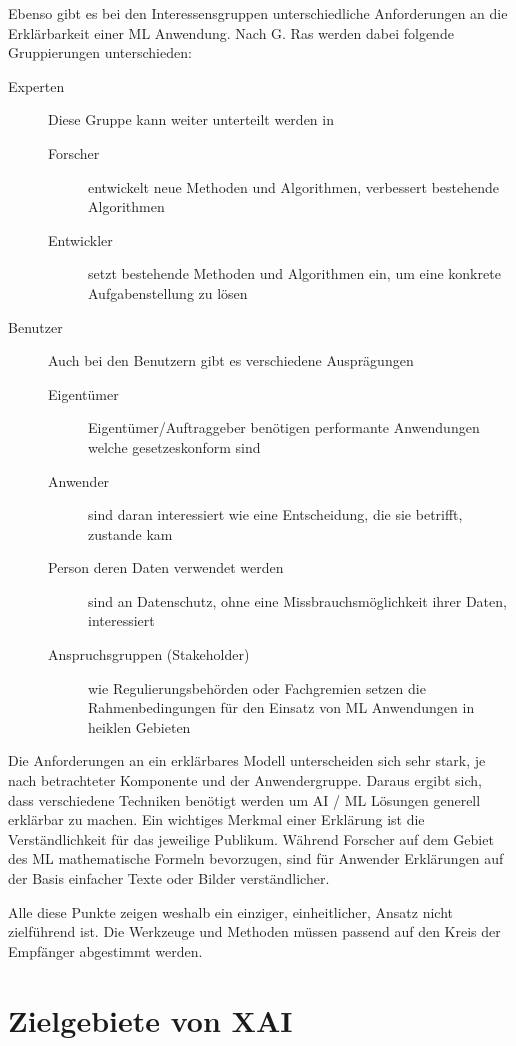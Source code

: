 \documentclass[
  12pt, %
  a4paper, %
  oneside, %
  openany, 
  numbers=noenddot, %
  BCOR=5mm, %
  parskip=half*, %
  thesis, %
]{bfhbook}
\begin{document}
Ebenso gibt es bei den Interessensgruppen unterschiedliche Anforderungen an die Erklärbarkeit einer ML Anwendung. Nach G. Ras \parencite{Ras2018} werden dabei folgende Gruppierungen unterschieden:
\begin{description}
  \item[Experten]
  Diese Gruppe kann weiter unterteilt werden in
  	\begin{description}
  		\item[Forscher] entwickelt neue Methoden und Algorithmen, verbessert bestehende Algorithmen
  		\item[Entwickler] setzt bestehende Methoden und Algorithmen ein, um eine konkrete Aufgabenstellung zu lösen
	\end{description}
  \item[Benutzer]
  Auch bei den Benutzern gibt es verschiedene Ausprägungen
  	\begin{description}
  		\item[Eigentümer] Eigentümer/Auftraggeber benötigen performante Anwendungen welche gesetzeskonform sind
  		\item[Anwender] sind daran interessiert wie eine Entscheidung, die sie betrifft, zustande kam
  		\item[Person deren Daten verwendet werden] sind an Datenschutz, ohne eine Missbrauchsmöglichkeit ihrer Daten, interessiert
  		\item[Anspruchsgruppen (Stakeholder)] wie Regulierungsbehörden oder Fachgremien setzen die Rahmenbedingungen für den Einsatz von \Gls{ML} Anwendungen in heiklen Gebieten
	\end{description}
\end{description}
Die Anforderungen an ein erklärbares Modell unterscheiden sich sehr stark, je nach betrachteter Komponente und der Anwendergruppe. Daraus ergibt sich, dass verschiedene Techniken benötigt werden um \Gls{AI} / \Gls{ML} Lösungen generell erklärbar zu machen.
\enlargethispage{\baselineskip}
Ein wichtiges Merkmal einer Erklärung ist die Verständlichkeit für das jeweilige Publikum. Während Forscher auf dem Gebiet des \gls{ML} mathematische Formeln bevorzugen, sind für Anwender Erklärungen auf der Basis einfacher Texte oder Bilder verständlicher.

Alle diese Punkte zeigen weshalb ein einziger, einheitlicher, Ansatz nicht zielführend ist. Die Werkzeuge und Methoden müssen passend auf den Kreis der Empfänger abgestimmt werden.

\chapter{Zielgebiete von XAI}
\end{document}
